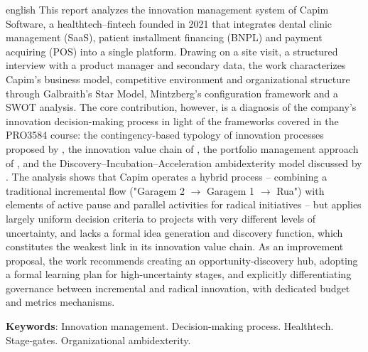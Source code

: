 \begin{resumo}[Abstract]
  \begin{otherlanguage*}{english}
\noindent This report analyzes the innovation management system of Capim Software, a healthtech--fintech founded in 2021 that integrates dental clinic management (SaaS), patient installment financing (BNPL) and payment acquiring (POS) into a single platform. Drawing on a site visit, a structured interview with a product manager and secondary data, the work characterizes Capim's business model, competitive environment and organizational structure through Galbraith's Star Model, Mintzberg's configuration framework and a SWOT analysis. The core contribution, however, is a diagnosis of the company's innovation decision-making process in light of the frameworks covered in the PRO3584 course: the contingency-based typology of innovation processes proposed by \textcite{salerno2015}, the innovation value chain of \textcite{hansenbirkinshaw2007}, the portfolio management approach of \textcite{goffinmitchell2010}, and the Discovery--Incubation--Acceleration ambidexterity model discussed by \textcite{salernogomes2018}. The analysis shows that Capim operates a hybrid process -- combining a traditional incremental flow ("Garagem 2 $\rightarrow$ Garagem 1 $\rightarrow$ Rua") with elements of active pause and parallel activities for radical initiatives -- but applies largely uniform decision criteria to projects with very different levels of uncertainty, and lacks a formal idea generation and discovery function, which constitutes the weakest link in its innovation value chain. As an improvement proposal, the work recommends creating an opportunity-discovery hub, adopting a formal learning plan for high-uncertainty stages, and explicitly differentiating governance between incremental and radical innovation, with dedicated budget and metrics mechanisms.

\vspace{\onelineskip}
\noindent\textbf{Keywords}: Innovation management. Decision-making process. Healthtech. Stage-gates. Organizational ambidexterity.
  \end{otherlanguage*}
\end{resumo}
